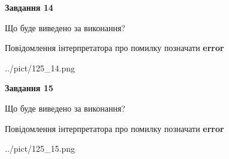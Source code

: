 \documentclass[11pt, ukrainian]{article}
\begin{document}
{\begin {large}
{\begin {center}\textbf{Завдання 14}\end {center}}\par
Що буде виведено за виконання? \par
Повідомлення інтерпретатора про помилку позначати \textbf{error}

\begin{center}
	{../pict/125_14.png}
\end{center}
\newpage

{\begin {center}\textbf{Завдання 15}\end {center}}\par
Що буде виведено за виконання? \par
Повідомлення інтерпретатора про помилку позначати \textbf{error}

\begin{center}
	{../pict/125_15.png}
\end{center}
\newpage

\end {large}}
\end{document}
